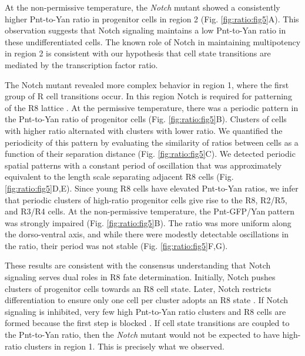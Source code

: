At the non-permissive temperature, the \textit{Notch} mutant showed a consistently higher Pnt-to-Yan ratio in progenitor cells in region 2 (Fig. \ref{fig:ratio:fig5}A). This observation suggests that Notch signaling maintains a low Pnt-to-Yan ratio in these undifferentiated cells. The known role of Notch in maintaining multipotency in region 2 \cite{Fortini1993} is consistent with our hypothesis that cell state transitions are mediated by the transcription factor ratio.

The Notch mutant revealed more complex behavior in region 1, where the first group of R cell transitions occur. In this region Notch is required for patterning of the R8 lattice \cite{Lubensky2011}. At the permissive temperature, there was a periodic pattern in the Pnt-to-Yan ratio of progenitor cells (Fig. \ref{fig:ratio:fig5}B). Clusters of cells with higher ratio alternated with clusters with lower ratio. We quantified the periodicity of this pattern by evaluating the similarity of ratios between cells as a function of their separation distance (Fig. \ref{fig:ratio:fig5}C). We detected periodic spatial patterns with a constant period of oscillation that was approximately equivalent to the length scale separating adjacent R8 cells (Fig. \ref{fig:ratio:fig5}D,E). Since young R8 cells have elevated Pnt-to-Yan ratios, we infer that periodic clusters of high-ratio progenitor cells give rise to the R8, R2/R5, and R3/R4 cells. At the non-permissive temperature, the Pnt-GFP/Yan pattern was strongly impaired (Fig. \ref{fig:ratio:fig5}B). The ratio was more uniform along the dorso-ventral axis, and while there were modestly detectable oscillations in the ratio, their period was not stable (Fig. \ref{fig:ratio:fig5}F,G).

These results are consistent with the consensus understanding that Notch signaling serves dual roles in R8 fate determination. Initially, Notch pushes clusters of progenitor cells towards an R8 cell state. Later, Notch restricts differentiation to ensure only one cell per cluster adopts an R8 state \cite{Baker1997,Li2001,Lubensky2011}. If Notch signaling is inhibited, very few high Pnt-to-Yan ratio clusters and R8 cells are formed because the first step is blocked \cite{Baker1997}. If cell state transitions are coupled to the Pnt-to-Yan ratio, then the \textit{Notch} mutant would not be expected to have high-ratio clusters in region 1. This is precisely what we observed.

